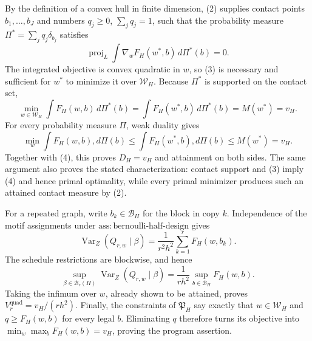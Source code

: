By the definition of a convex hull in finite dimension, (2) supplies contact points \(b_1,\ldots,b_J\) and numbers \(q_j\ge0\), \(\sum_jq_j=1\), such that the probability measure \(\Pi^*=\sum_jq_j\delta_{b_j}\) satisfies
\[
\operatorname{proj}_L\int\nabla_wF_H(w^*,b)\,d\Pi^*(b)=0. \tag{3}
\]
The integrated objective is convex quadratic in \(w\), so (3) is necessary and sufficient for \(w^*\) to minimize it over \(\mathcal W_H\).  Because \(\Pi^*\) is supported on the contact set,
\[
\min_{w\in\mathcal W_H}\int F_H(w,b)\,d\Pi^*(b)
=\int F_H(w^*,b)\,d\Pi^*(b)=M(w^*)=v_H. \tag{4}
\]
For every probability measure \(\Pi\), weak duality gives
\[
\min_w\int F_H(w,b),d\Pi(b)
\le \int F_H(w^*,b),d\Pi(b)
\le M(w^*)=v_H.
\]
Together with (4), this proves \(D_H=v_H\) and attainment on both sides.  The same argument also proves the stated characterization: contact support and (3) imply (4) and hence primal optimality, while every primal minimizer produces such an attained contact measure by (2).

For a repeated graph, write \(b_k\in\mathcal B_H\) for the block in copy \(k\).  Independence of the motif assignments under \(\mathrm{ass:bernoulli\text{-}half\text{-}design}\) gives
\[
\operatorname{Var}_Z(Q_{r,w}\mid\beta)
=\frac1{r^2h^2}\sum_{k=1}^rF_H(w,b_k).
\]
The schedule restrictions are blockwise, and hence
\[
\sup_{\beta\in\mathcal B_r(H)}\operatorname{Var}_Z(Q_{r,w}\mid\beta)
=\frac1{rh^2}\sup_{b\in\mathcal B_H}F_H(w,b).
\]
Taking the infimum over \(w\), already shown to be attained, proves \(V_r^{\mathrm{quad}}=v_H/(rh^2)\).  Finally, the constraints of \(\mathfrak P_H\) say exactly that \(w\in\mathcal W_H\) and \(q\ge F_H(w,b)\) for every legal \(b\).  Eliminating \(q\) therefore turns its objective into \(\min_w\max_bF_H(w,b)=v_H\), proving the program assertion.

